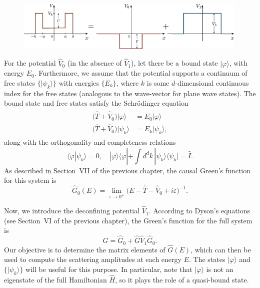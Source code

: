 \documentclass[pra,12pt]{revtex4}
\begin{document}
\begin{figure}[h]
  \centering\includegraphics[width=0.99\textwidth]{resonancewell_decomp}
\end{figure}

For the potential $\hat{V}_0$ (in the absence of $\hat{V}_1$), let
there be a bound state $|\varphi\rangle$, with energy $E_0$.
Furthermore, we assume that the potential supports a continuum of free
states $\{|\psi_k\rangle\}$ with energies $\{E_k\}$, where $k$ is some
$d$-dimensional continuous index for the free states (analogous to the
wave-vector for plane wave states).  The bound state and free states
satisfy the Schr\"odinger equation
\begin{align}
  \begin{aligned}\big(\hat{T} + \hat{V}_0\big) |\varphi\rangle \; &= E_0 |\varphi\rangle \\ \big(\hat{T} + \hat{V}_0\big) |\psi_k\rangle &= E_k |\psi_k\rangle,
  \end{aligned}
\end{align}
along with the orthogonality and completeness relations
\begin{equation}
  \langle\varphi|\psi_k\rangle = 0, \quad |\varphi\rangle\langle\varphi| + \int d^dk\, |\psi_k\rangle\langle\psi_k| = \hat{I}.
\end{equation}
As described in Section~VII of the previous chapter, the causal
Green's function for this system is
\begin{equation}
  \hat{G}_0(E) = \lim_{\varepsilon\rightarrow0^+} \Big(E - \hat{T} - \hat{V}_0 + i\varepsilon\Big)^{-1}.
\end{equation}

Now, we introduce the deconfining potential $\hat{V}_1$.  According to
Dyson's equations (see Section~VI of the previous chapter), the
Green's function for the full system is
\begin{equation}
  \hat{G} = \hat{G}_0 + \hat{G} \hat{V}_1 \hat{G}_0.
\end{equation}
Our objective is to determine the matrix elements of $\hat{G}(E)$,
which can then be used to compute the scattering amplitudes at each
energy $E$.  The states $|\varphi\rangle$ and $\{|\psi_k\rangle\}$
will be useful for this purpose.  In particular, note that
$|\varphi\rangle$ is not an eigenstate of the full Hamiltonian
$\hat{H}$, so it plays the role of a quasi-bound state.
\end{document}

